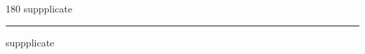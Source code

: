 
\begin{frame}
\begin{center}
\begin{turn}{180}
{\fontsize{2.5cm}{1em}\selectfont suppplicate}
\end{turn}
\vspace{1em}\par  
\hrule
\vspace{1em}\par  
{\fontsize{2.5cm}{1em}\selectfont suppplicate}
\end{center}
\end{frame}
